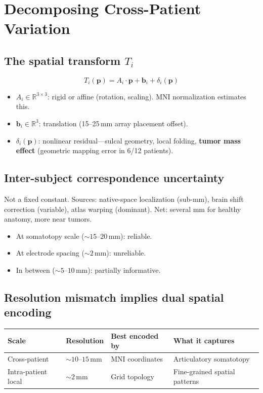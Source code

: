 \documentclass[11pt,letterpaper]{article}
\newcommand{\bfp}{\mathbf{p}}
\newcommand{\bfb}{\mathbf{b}}
\newcommand{\R}{\mathbb{R}}
\begin{document}
\section{Decomposing Cross-Patient Variation}

\subsection{The spatial transform $T_i$}

\begin{equation}\label{eq:transform}
T_i(\bfp) = A_i \cdot \bfp + \bfb_i + \delta_i(\bfp)
\end{equation}
\begin{itemize}[leftmargin=2em]
\item $A_i \in \R^{3 \times 3}$: rigid or affine (rotation, scaling). MNI normalization estimates this.
\item $\bfb_i \in \R^3$: translation (15--25\,mm array placement offset).
\item $\delta_i(\bfp)$: nonlinear residual---sulcal geometry, local folding, \textbf{tumor mass effect} (geometric mapping error in 6/12 patients).
\end{itemize}

\subsection{Inter-subject correspondence uncertainty}

Not a fixed constant. Sources: native-space localization (sub-mm), brain shift correction (variable), atlas warping (dominant). Net: several mm for healthy anatomy, more near tumors.
\begin{itemize}[leftmargin=2em]
\item At somatotopy scale (${\sim}15$--$20$\,mm): reliable.
\item At electrode spacing (${\sim}2$\,mm): unreliable.
\item In between (${\sim}5$--$10$\,mm): partially informative.
\end{itemize}

\subsection{Resolution mismatch implies dual spatial encoding}

\begin{table}[h]
\centering\small
\begin{tabular}{@{}llll@{}}
\toprule
\textbf{Scale} & \textbf{Resolution} & \textbf{Best encoded by} & \textbf{What it captures} \\
\midrule
Cross-patient & ${\sim}10$--$15$\,mm & MNI coordinates & Articulatory somatotopy \\
Intra-patient local & ${\sim}2$\,mm & Grid topology & Fine-grained spatial patterns \\
\bottomrule
\end{tabular}
\end{table}
\end{document}
